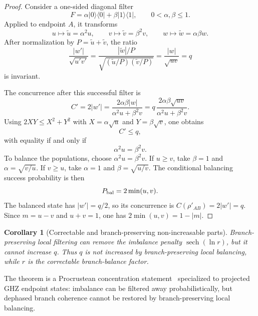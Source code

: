 \documentclass[reprint,aps,pra,superscriptaddress,nofootinbib,longbibliography]{revtex4-2}
\newtheorem{corollary}[theorem]{Corollary}
\newcommand{\ket}[1]{|#1\rangle}
\newcommand{\bra}[1]{\langle #1|}
\newcommand{\sech}{\operatorname{sech}}
\begin{document}
\begin{proof}
Consider a one-sided diagonal filter
\begin{equation}
F=\alpha\ket{0}\bra{0}+\beta\ket{1}\bra{1},
\qquad
0<\alpha,\beta\le1.
\end{equation}
Applied to endpoint \(A\), it transforms
\begin{equation}
u\mapsto \tilde u=\alpha^2u,
\qquad
v\mapsto \tilde v=\beta^2v,
\qquad
w\mapsto \tilde w=\alpha\beta w.
\end{equation}
After normalization by \(P=\tilde u+\tilde v\), the ratio
\begin{equation}
\frac{|w'|}{\sqrt{u'v'}}
=
\frac{|\tilde w|/P}{\sqrt{(\tilde u/P)(\tilde v/P)}}
=
\frac{|w|}{\sqrt{uv}}
=q
\end{equation}
is invariant.

The concurrence after this successful filter is
\begin{equation}
C'=2|w'|
=
\frac{2\alpha\beta |w|}{\alpha^2u+\beta^2v}
=
q\,
\frac{2\alpha\beta\sqrt{uv}}{\alpha^2u+\beta^2v}.
\end{equation}
Using \(2XY\le X^2+Y^2\) with \(X=\alpha\sqrt u\) and \(Y=\beta\sqrt v\), one obtains
\begin{equation}
C'\le q,
\end{equation}
with equality if and only if
\begin{equation}
\alpha^2u=\beta^2v.
\label{eq:filter-balance-condition}
\end{equation}
To balance the populations, choose \(\alpha^2u=\beta^2v\).  If \(u\ge v\), take \(\beta=1\) and \(\alpha=\sqrt{v/u}\).  If \(v\ge u\), take \(\alpha=1\) and \(\beta=\sqrt{u/v}\).  The conditional balancing success probability is then
\begin{equation}
P_{\rm bal}=2\min(u,v).
\end{equation}
The balanced state has \(|w'|=q/2\), so its concurrence is \(C(\rho'_{AB})=2|w'|=q\).  Since \(m=u-v\) and \(u+v=1\), one has \(2\min(u,v)=1-|m|\).
\end{proof}

\begin{corollary}[Correctable and branch-preserving non-increasable parts]
Branch-preserving local filtering can remove the imbalance penalty \(\sech(\ln r)\), but it cannot increase \(q\).  Thus \(q\) is not increased by branch-preserving local balancing, while \(r\) is the correctable branch-balance factor.
\end{corollary}

The theorem is a Procrustean concentration statement~\cite{Bennett1996} specialized to projected GHZ endpoint states: imbalance can be filtered away probabilistically, but dephased branch coherence cannot be restored by branch-preserving local balancing.
\end{document}
